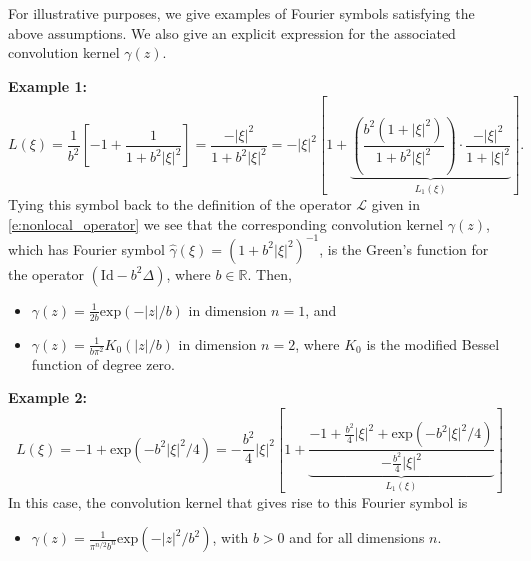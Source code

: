 \documentclass[11pt]{amsart}   	%
\theoremstyle{plain}
\numberwithin{equation}{section}
\def\R{\mathbb{R}}
\def\exp{\text{exp}}
\newcommand{\JMS}[1]{{\color{orange} {\bf J. Siktar:} [#1] }}
\begin{document}
For illustrative purposes, we give examples of Fourier symbols satisfying the above assumptions. We also give an explicit expression for the associated convolution kernel $\gamma(z)$.

{\bf Example 1:} 
\[ L(\xi) = \frac{1}{b^2} \left[ -1 + \frac{1}{1+ b^2 |\xi|^2} \right] = \frac{-|\xi|^2}{1 +b^2  |\xi|^2} = -|\xi|^2 \left[ 1 + \underbrace{\left( \frac{b^2(1+|\xi|^2)}{1+b^2 |\xi|^2} \right) \cdot   \frac{-|\xi|^2}{1 + |\xi|^2} }_{L_1(\xi)} \right]. \]
Tying this symbol back to the definition of the operator $\mathcal{L}$ given in \eqref{e:nonlocal_operator} we see that the corresponding convolution kernel $\gamma(z)$, which has Fourier symbol $\hat{\gamma}(\xi) = (1+b^2|\xi|^2)^{-1}$, is the Green's function for the  operator $( \mathrm{Id} -b^2 \Delta)$, where $b\in \R$. Then,
\begin{itemize}
\item $\gamma(z) = \frac{1}{2b} \exp(-|z|/b)$ in dimension $n=1$, and
\item $\gamma(z) = \frac{1}{b\pi^2} K_0(|z|/b)$  in dimension $n=2$, where $K_0$ is the modified Bessel function of degree zero.
\end{itemize}


{\bf Example 2:}
\[ L(\xi) =  -1 + \exp(-b^2 |\xi|^2/4)  = -\frac{b^2}{4} |\xi|^2 \left[ 1+  \underbrace{\frac{-1 + \frac{b^2}{4} |\xi|^2 + \exp(-b^2 |\xi|^2/4)}{ -\frac{b^2}{4} |\xi|^2}}_{L_1(\xi)} \right] \]
In this case, the convolution kernel that gives rise to this Fourier symbol is
\begin{itemize}
\item $\gamma(z) = \frac{1}{\pi^{n/2} b^n} \exp( -|z|^2/b^2)  $, with $b>0$ and for all dimensions $n$.
\end{itemize}



\end{document}
